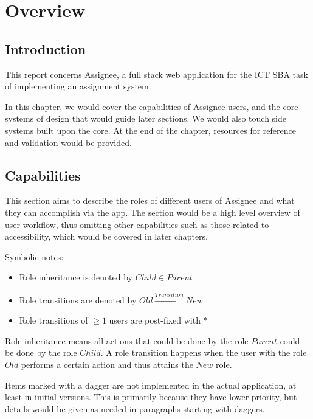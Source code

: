 \chapter{Overview}
\label{overview}

\section{Introduction}
\label{overview.intro}

This report concerns Assignee, a full stack web application for the ICT SBA task
of implementing an assignment system.

In this chapter, we would cover the capabilities of Assignee users, and the core
systems of design that would guide later sections. We would also touch side systems
built upon the core. At the end of the chapter, resources for reference and validation
would be provided.

\section{Capabilities}
\label{overview.capab}

This section aims to describe the roles of different users of Assignee and what
they can accomplish via the app. The section would be a high level overview of user
workflow, thus omitting other capabilities such as those related to
accessibility, which would be covered in later chapters.

Symbolic notes:
\begin{itemize}
	\item Role inheritance is denoted by $Child\in{}Parent$

	\item Role transitions are denoted by $Old\xrightarrow{Transition}New$

	\item Role transitions of $\geq{}1$ users are post-fixed with $*$
\end{itemize}

Role inheritance means all actions that could be done by the role $Parent$ could
be done by the role $Child$. A role transition happens when the user with the
role $Old$ performs a certain action and thus attains the $New$ role.

Items marked with a dagger \textdagger{} are not implemented in the actual application,
at least in initial versions. This is primarily because they have lower priority,
but details would be given as needed in paragraphs starting with daggers.

